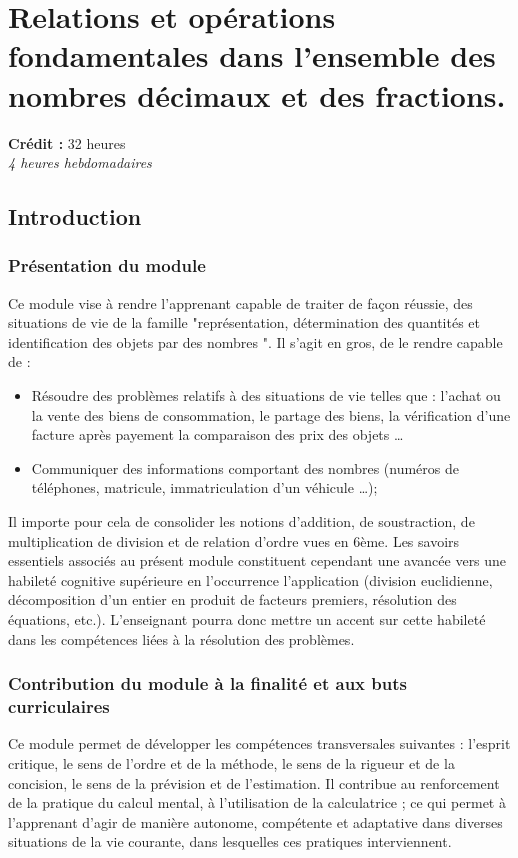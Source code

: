 \chapter{Relations et opérations fondamentales dans l'ensemble des nombres décimaux et des fractions.}

{\AlegreyaSansLight \large
\begin{center}
\textbf{Crédit :} 32 heures\\
\textit{4 heures hebdomadaires}
\end{center}
}

\minitoc

\section{Introduction}
\subsection{Présentation du module}
Ce module vise à rendre l'apprenant capable de traiter de façon réussie, des situations de vie de la famille "représentation, détermination des quantités et identification des objets par des nombres ". Il s'agit en gros, de le rendre capable de :
\begin{itemize}
\item Résoudre des problèmes relatifs à des situations de vie telles que : l'achat ou la vente des biens de consommation, le partage des biens, la vérification d'une facture après payement la comparaison des prix des objets …
\item Communiquer des informations comportant des nombres (numéros de téléphones, matricule, immatriculation d'un véhicule …);
\end{itemize}
Il importe pour cela de consolider les notions d'addition, de soustraction, de multiplication de division et de relation d'ordre vues en 6ème. Les savoirs essentiels associés au présent module constituent cependant une avancée vers une habileté cognitive supérieure en l'occurrence l'application (division euclidienne, décomposition
d'un entier en produit de facteurs premiers, résolution des équations, etc.). L'enseignant pourra donc mettre un accent sur cette habileté dans les compétences liées à la résolution des problèmes.

\subsection{Contribution du module à la finalité et aux buts curriculaires}
Ce module permet de développer les compétences transversales suivantes : l'esprit critique, le sens de l'ordre et de la méthode, le sens de la rigueur et de la concision, le sens de la prévision et de l'estimation. Il contribue au renforcement de la pratique du calcul mental, à l'utilisation de la calculatrice ; ce qui permet à l'apprenant d'agir de manière autonome, compétente et adaptative dans diverses situations de la vie courante, dans lesquelles ces pratiques interviennent.

